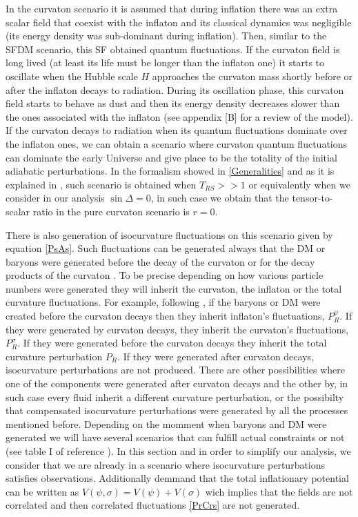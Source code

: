 \documentclass[amssymb,twocolumn,prd,nofootinbib,showpacs]{revtex4-1}
\begin{document}
In the curvaton scenario it is assumed that during inflation there was an extra scalar field that coexist with the inflaton and its classical dynamics was negligible (its energy density was sub-dominant during inflation). Then, similar to the SFDM scenario, this SF obtained quantum fluctuations. If the curvaton field is long lived (at least its life must be longer than the inflaton one) it starts to oscillate when the Hubble scale $H$ approaches the curvaton mass shortly before or after the inflaton decays to radiation. During its oscillation phase, this curvaton field starts to behave as dust and then its energy density decreases slower than the ones associated with the inflaton (see appendix [B] for a review of the model). If the curvaton decays to radiation when its quantum fluctuations dominate over the inflaton ones, we can obtain a scenario where curvaton quantum fluctuations can dominate the early Universe and give place to be the totality of the initial adiabatic perturbations. In the formalism showed in \ref{Generalities} and as it is explained in \cite{twofields}, such scenario is obtained when $T_{RS}>>1$ or equivalently when we consider in our analysis $\sin\Delta = 0$, in such case we obtain that the tensor-to-scalar ratio in the pure curvaton scenario is $r=0$. 

There is also generation of isocurvature fluctuations on this scenario given by equation \eqref{PsAs}. Such fluctuations can be generated always that the DM or baryons were generated before the decay of the curvaton or for the decay products of the curvaton \cite{curvaton9,curvaton10,curvaton11}. To be precise depending on how various particle numbers were generated they will inherit the curvaton, the inflaton or the total curvature fluctuations. For example, following \cite{curvaton12,curvaton13,curvaton14}, if the baryons or DM were created before the curvaton decays then they inherit inflaton's fluctuations, $P_R^\psi$. If they were generated by curvaton decays, they inherit the curvaton's fluctuations, $P_R^\sigma$. If they were generated before the curvaton decays they inherit the total curvature perturbation $P_R$. If they were generated after curvaton decays, isocurvature perturbations are not produced. There are other possibilities where one of the components were generated after curvaton decays and the other by, in such case every fluid inherit a different curvature perturbation, or the possibilty that compensated isocurvature perturbations \cite{curvaton14} were generated by all the processes mentioned before. Depending on the momment when baryons and DM were generated we will have several scenarios that can fulfill actual constraints or not (see table I of reference \cite{curvaton14}). In this section and in order to simplify our analysis, we consider that we are already in a scenario where isocurvature perturbations satisfies observations. Additionally demmand that the total inflationary potential can be written as $V(\psi,\sigma)=V(\psi)+V(\sigma)$ wich implies that the fields are not correlated and then correlated fluctuations \eqref{PrCrs} are not generated. 
\end{document}

